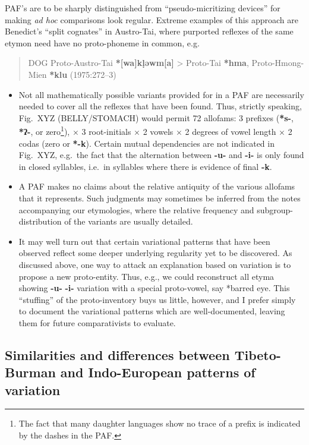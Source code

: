 PAF’s are to be sharply distinguished from “pseudo-micritizing devices” for making \textit{ad hoc} comparisons look regular. Extreme examples of this approach are Benedict’s “split cognates” in Austro-Tai, where purported reflexes of the same etymon need have no proto-phoneme in common, e.g.\ 
\begin{quote}
DOG \hfill Proto-Austro-Tai \textbf{*[wa]k\d{l}əwm[a]} > Proto-Tai \textbf{*hma}, Proto-Hmong-Mien \textbf{*klu} (1975:272–3)
\end{quote}

\begin{itemize}
\item Not all mathematically possible variants provided for in a PAF are necessarily needed to cover all the reflexes that have been found. Thus, strictly speaking, Fig.~XYZ (BELLY/STOMACH) would permit 72 allofams: 3 prefixes (\textbf{*s-}, \textbf{*ʔ-}, or zero\footnote{The fact that many daughter languages show no trace of a prefix is indicated by the dashes in the PAF.}), $\times$ 3 root-initials $\times$ 2 vowels $\times$ 2 degrees of vowel length $\times$ 2 codas (zero or \textbf{*-k}). Certain mutual dependencies are not indicated in Fig.~XYZ, e.g.\ the fact that the alternation between \textbf{-u-} and \textbf{-i-} is only found in closed syllables, i.e.\ in syllables where there is evidence of final \textbf{-k}.

\item A PAF makes no claims about the relative antiquity of the various allofams that it represents. Such judgments may sometimes be inferred from the notes accompanying our etymologies, where the relative frequency and subgroup-distribution of the variants are usually detailed.

\item It may well turn out that certain variational patterns that have been observed reflect some deeper underlying regularity yet to be discovered. As discussed above, one way to attack an explanation based on variation is to propose a new proto-entity. Thus, e.g., we could reconstruct all etyma showing \textbf{-u-}  \textbf{-i-} variation with a special proto-vowel, say *barred eye. This “stuffing” of the proto-inventory buys us little, however, and I prefer simply to document the variational patterns which are well-documented, leaving them for future comparativists to evaluate.
\end{itemize}

\subsection{Similarities and differences between Tibeto-Burman and Indo-European patterns of variation}

